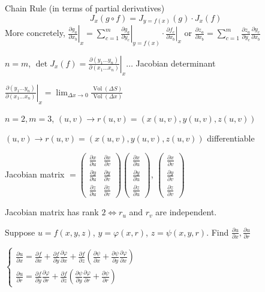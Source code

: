 Chain Rule (in terms of partial derivatives)
$$J_x(g\circ f)=J_{y=f(x)}(g)\cdot J_x(f)$$
More concretely, $\left.\frac{\partial g_a}{\partial x_b}\right|_x=\sum_{c=1}^m\left.\frac{\partial g_a}{\partial y_c}\right|_{y=f(x)}\cdot\left.\frac{\partial f_c}{\partial x_b}\right|_x$ or $\boxed{\frac{\partial z_a}{\partial x_b}=\sum_{c=1}^m\frac{\partial z_a}{\partial y_c}\frac{\partial y_c}{\partial x_b}}$

$n=m$, $\det J_x(f)=\left.\frac{\partial(y_1\dots y_n)}{\partial(x_1\dots x_n)}\right|_x\dots$ Jacobian determinant

$\left.\frac{\partial(y_1\dots y_n)}{\partial(x_1\dots x_n)}\right|_x=\lim_{\Delta x\to0}\frac{\operatorname{Vol}(\Delta S)}{\operatorname{Vol}(\Delta x)}$

$n=2,m=3$, $(u,v)\to r(u,v)=(x(u,v),y(u,v),z(u,v))$

$(u,v)\to r(u,v)=(x(u,v),y(u,v),z(u,v))$ differentiable

Jacobian matrix $=\begin{pmatrix}
        \frac{\partial x}{\partial u} & \frac{\partial x}{\partial v} \\
        \frac{\partial y}{\partial u} & \frac{\partial y}{\partial v} \\
        \frac{\partial z}{\partial u} & \frac{\partial z}{\partial v}
    \end{pmatrix}$\quad$\begin{pmatrix}
        \frac{\partial x}{\partial u} \\
        \frac{\partial y}{\partial u} \\
        \frac{\partial z}{\partial u}
    \end{pmatrix}$, $\begin{pmatrix}
        \frac{\partial x}{\partial v} \\
        \frac{\partial y}{\partial v} \\
        \frac{\partial z}{\partial v}
    \end{pmatrix}$

Jacobian matrix has rank $2\iff r_u$ and $r_v$ are independent.

\begin{example}
    Suppose $u=f(x,y,z)$, $y=\varphi(x,r)$, $z=\psi(x,y,r)$. Find $\frac{\partial u}{\partial x},\frac{\partial u}{\partial r}$

    $\begin{cases}
            \frac{\partial u}{\partial x}=\frac{\partial f}{\partial x}+\frac{\partial f}{\partial y}\frac{\partial \varphi}{\partial x}+\frac{\partial f}{\partial z}\left(\frac{\partial \psi}{\partial x}+\frac{\partial \psi}{\partial y}\frac{\partial \varphi}{\partial x}\right) \\
            \frac{\partial u}{\partial r}=\frac{\partial f}{\partial y}\frac{\partial\varphi}{\partial r}+\frac{\partial f}{\partial z}\left(\frac{\partial\psi}{\partial y}\frac{\partial\varphi}{\partial r}+\frac{\partial\psi}{\partial r}\right)
        \end{cases}$
\end{example}

